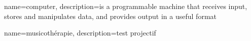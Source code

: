 {
  name=computer,
  description={is a programmable machine that receives input,
               stores and manipulates data, and provides
               output in a useful format}
}

{
  name=musicothérapie,
  description={test projectif}
}




